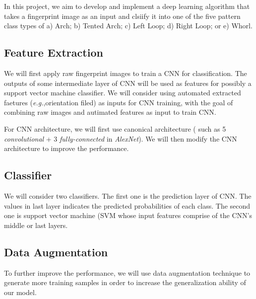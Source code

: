 
In this project, we aim to develop and implement a deep learning algorithm that takes a fingerprint image as an input and clsiify it into one of the five pattern class types of a) Arch; b) Tented Arch; c) Left Loop; d) Right Loop; or e) Whorl. 

\subsection{Feature Extraction}
%
We will first apply raw fingerprint images to train a CNN for classification. The outputs of some intermediate layer  of CNN will be used as features for possibly a support vector machine classifier.
%
We will consider using automated extracted faetures (\textit{e.g.},orientation filed) as inputs for CNN training, with the goal of combining raw images and autimated features as input to train CNN.

For CNN architecture, we will first use canonical architecture ( such as 5 \textit{convolutional} + 3 \textit{fully-connected} in \textit{AlexNet}\cite{krizhevsky2012imagenet}). We will then modify the CNN architecture to improve the performance.
%
\subsection{Classifier}
%
We will consider two classifiers. The first one is the prediction layer of CNN. The values in last layer indicates the predicted probabilities of each class.
%
The second one is support vector machine (SVM whose input features comprise of the CNN’s middle or last layers.

\subsection{Data Augmentation}
%
To further improve the performance, we will use data augmentation technique to generate more training samples in order to increase the generalization ability of our model.
